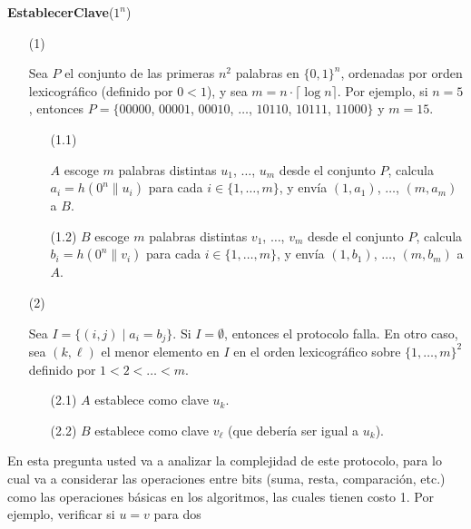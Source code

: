 \begin{flushleft}
{\bf EstablecerClave}($1^n$)
\begin{enumerate}

\item[(1)] \begin{minipage}[t]{\linewidth}
Sea $P$ el conjunto de las primeras $n^2$ palabras en $\{0,1\}^n$, ordenadas por orden lexicográfico (definido por $0 < 1$), y sea $m = n \cdot \lceil \log n \rceil$. Por ejemplo, si $n = 5$, entonces $P=\{00000$, $00001$, $00010$, $\ldots$, $10110$, $10111$, $11000 \}$ y $m = 15$.
\end{minipage}
\begin{enumerate}
\item[(1.1)] \begin{minipage}[t]{\linewidth} $A$ escoge $m$ palabras distintas $u_1$, $\ldots$, $u_m$ desde el conjunto $P$, calcula $a_i = h(0^n \| u_i)$ para cada $i \in \{1, \ldots, m\}$, y envía $(1,a_1)$, $\ldots$, $(m,a_m)$ a $B$.
\end{minipage}

\item[(1.2)] $B$ escoge $m$ palabras distintas $v_1$, $\ldots$, $v_m$ desde el conjunto $P$, calcula $b_i = h(0^n \| v_i)$ para cada $i \in \{1, \ldots, m\}$, y envía $(1, b_1)$, $\ldots$, $(m, b_m)$ a $A$.
\end{enumerate}
\item[(2)] \begin{minipage}[t]{\linewidth}
Sea $I = \{ (i,j) \mid a_i = b_j\}$. Si $I = \emptyset$, entonces el protocolo falla. En otro caso, sea $(k, \ell)$ el menor elemento en $I$ en el orden lexicográfico sobre $\{1, \ldots, m\}^2$ definido por $1 < 2 < \dots < m$.
\end{minipage}
\begin{enumerate}
\item[(2.1)] $A$ establece como clave $u_{k}$.
\item[(2.2)] $B$ establece como clave $v_\ell$ (que debería ser igual a $u_k$).
\end{enumerate}
\end{enumerate}
\end{flushleft}
En esta pregunta usted va a analizar la complejidad de este protocolo,
para lo cual va a considerar las operaciones entre bits (suma, resta,
comparación, etc.) como las operaciones básicas en los algoritmos, las
cuales tienen costo 1. Por ejemplo, verificar si $u = v$ para dos
